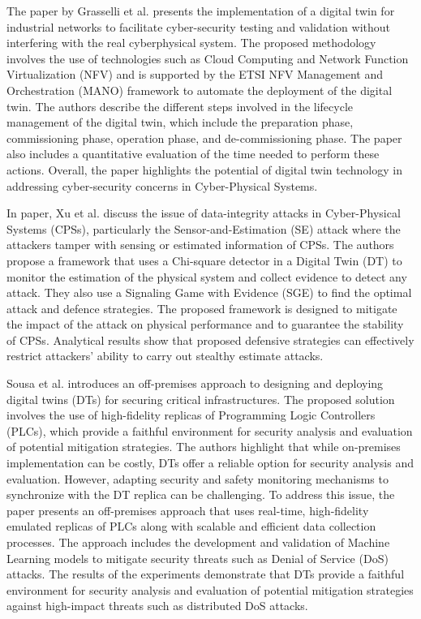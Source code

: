 The paper by Grasselli et al.\cite{grasselliIndustrialNetworkDigital2022} presents the implementation of a digital twin for industrial networks to facilitate cyber-security testing and validation without interfering with the real cyberphysical system. The proposed methodology involves the use of technologies such as Cloud Computing and Network Function Virtualization (NFV) and is supported by the ETSI NFV Management and Orchestration (MANO) framework to automate the deployment of the digital twin. The authors describe the different steps involved in the lifecycle management of the digital twin, which include the preparation phase, commissioning phase, operation phase, and de-commissioning phase. The paper also includes a quantitative evaluation of the time needed to perform these actions. Overall, the paper highlights the potential of digital twin technology in addressing cyber-security concerns in Cyber-Physical Systems.


In\cite{xuGametheoreticApproachSecure2020} paper, Xu et al. discuss the issue of data-integrity attacks in Cyber-Physical Systems (CPSs), particularly the Sensor-and-Estimation (SE) attack where the attackers tamper with sensing or estimated information of CPSs. The authors propose a framework that uses a Chi-square detector in a Digital Twin (DT) to monitor the estimation of the physical system and collect evidence to detect any attack. They also use a Signaling Game with Evidence (SGE) to find the optimal attack and defence strategies. The proposed framework is designed to mitigate the impact of the attack on physical performance and to guarantee the stability of CPSs. Analytical results show that proposed defensive strategies can effectively restrict attackers' ability to carry out stealthy estimate attacks.


Sousa et al.\cite{sousaELEGANTSecurityCritical2021} introduces an off-premises approach to designing and deploying digital twins (DTs) for securing critical infrastructures. The proposed solution involves the use of high-fidelity replicas of Programming Logic Controllers (PLCs), which provide a faithful environment for security analysis and evaluation of potential mitigation strategies. The authors highlight that while on-premises implementation can be costly, DTs offer a reliable option for security analysis and evaluation. However, adapting security and safety monitoring mechanisms to synchronize with the DT replica can be challenging. To address this issue, the paper presents an off-premises approach that uses real-time, high-fidelity emulated replicas of PLCs along with scalable and efficient data collection processes. The approach includes the development and validation of Machine Learning models to mitigate security threats such as Denial of Service (DoS) attacks. The results of the experiments demonstrate that DTs provide a faithful environment for security analysis and evaluation of potential mitigation strategies against high-impact threats such as distributed DoS attacks.

